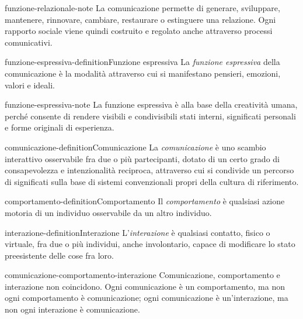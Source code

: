 \documentclass[preview]{standalone}
\begin{document}
\begin{snippet}{funzione-relazionale-note}
    La comunicazione permette di generare, sviluppare, mantenere, rinnovare,
    cambiare, restaurare o estinguere una relazione. Ogni rapporto sociale viene
    quindi costruito e regolato anche attraverso processi comunicativi.
\end{snippet}

\begin{snippetdefinition}{funzione-espressiva-definition}{Funzione espressiva}
    La \emph{funzione espressiva} della comunicazione è la modalità attraverso
    cui si manifestano pensieri, emozioni, valori e ideali.
\end{snippetdefinition}

\begin{snippet}{funzione-espressiva-note}
    La funzione espressiva è alla base della creatività umana, perché consente
    di rendere visibili e condivisibili stati interni, significati personali e
    forme originali di esperienza.
\end{snippet}

\begin{snippetdefinition}{comunicazione-definition}{Comunicazione}
    La \emph{comunicazione} è uno scambio interattivo osservabile fra due o più
    partecipanti, dotato di un certo grado di consapevolezza e intenzionalità
    reciproca, attraverso cui si condivide un percorso di significati sulla base
    di sistemi convenzionali propri della cultura di riferimento.
\end{snippetdefinition}

\begin{snippetdefinition}{comportamento-definition}{Comportamento}
    Il \emph{comportamento} è qualsiasi azione motoria di un individuo
    osservabile da un altro individuo.
\end{snippetdefinition}

\begin{snippetdefinition}{interazione-definition}{Interazione}
    L'\emph{interazione} è qualsiasi contatto, fisico o virtuale, fra due o più
    individui, anche involontario, capace di modificare lo stato preesistente
    delle cose fra loro.
\end{snippetdefinition}

\begin{snippet}{comunicazione-comportamento-interazione}
    Comunicazione, comportamento e interazione non coincidono. Ogni comunicazione
    è un comportamento, ma non ogni comportamento è comunicazione; ogni
    comunicazione è un'interazione, ma non ogni interazione è comunicazione.
\end{snippet}
\end{document}
